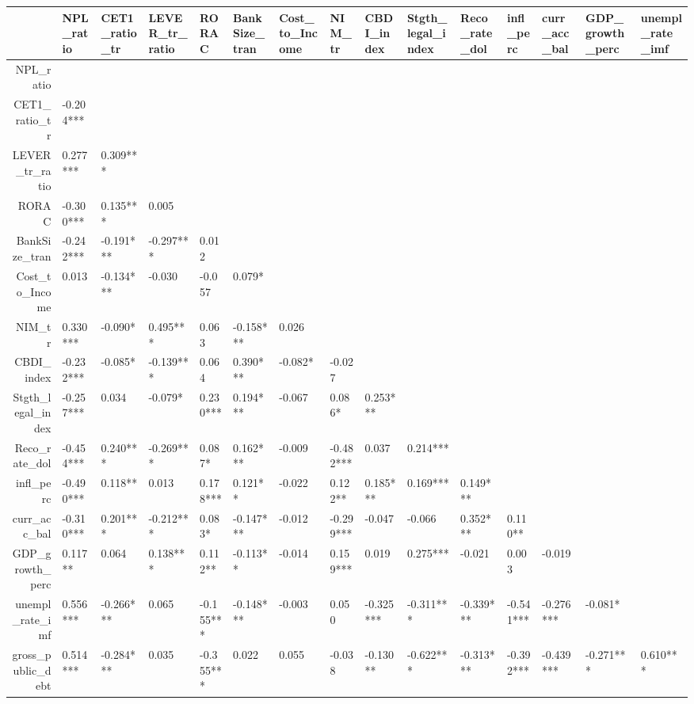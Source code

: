 \begin{table}[ht]
\centering
\begin{tabular}{rllllllllllllll}
  \hline
 & NPL\_ratio & CET1\_ratio\_tr & LEVER\_tr\_ratio & RORAC & BankSize\_tran & Cost\_to\_Income & NIM\_tr & CBDI\_index & Stgth\_legal\_index & Reco\_rate\_dol & infl\_perc & curr\_acc\_bal & GDP\_growth\_perc & unempl\_rate\_imf \\ 
  \hline
NPL\_ratio &  &  &  &  &  &  &  &  &  &  &  &  &  &  \\ 
  CET1\_ratio\_tr & -0.204*** &  &  &  &  &  &  &  &  &  &  &  &  &  \\ 
  LEVER\_tr\_ratio &  0.277*** &  0.309*** &  &  &  &  &  &  &  &  &  &  &  &  \\ 
  RORAC & -0.300*** &  0.135***  &  0.005     &  &  &  &  &  &  &  &  &  &  &  \\ 
  BankSize\_tran & -0.242*** & -0.191*** & -0.297*** &  0.012     &  &  &  &  &  &  &  &  &  &  \\ 
  Cost\_to\_Income &  0.013     & -0.134***  & -0.030     & -0.057     &  0.079*    &  &  &  &  &  &  &  &  &  \\ 
  NIM\_tr &  0.330*** & -0.090*    &  0.495*** &  0.063     & -0.158*** &  0.026     &  &  &  &  &  &  &  &  \\ 
  CBDI\_index & -0.232*** & -0.085*    & -0.139***  &  0.064     &  0.390*** & -0.082*    & -0.027     &  &  &  &  &  &  &  \\ 
  Stgth\_legal\_index & -0.257*** &  0.034     & -0.079*    &  0.230*** &  0.194*** & -0.067     &  0.086*    &  0.253*** &  &  &  &  &  &  \\ 
  Reco\_rate\_dol & -0.454*** &  0.240*** & -0.269*** &  0.087*    &  0.162*** & -0.009     & -0.482*** &  0.037     &  0.214*** &  &  &  &  &  \\ 
  infl\_perc & -0.490*** &  0.118**   &  0.013     &  0.178*** &  0.121**   & -0.022     &  0.122**   &  0.185*** &  0.169*** &  0.149***  &  &  &  &  \\ 
  curr\_acc\_bal & -0.310*** &  0.201*** & -0.212*** &  0.083*    & -0.147***  & -0.012     & -0.299*** & -0.047     & -0.066     &  0.352*** &  0.110**   &  &  &  \\ 
  GDP\_growth\_perc &  0.117**   &  0.064     &  0.138***  &  0.112**   & -0.113**   & -0.014     &  0.159*** &  0.019     &  0.275*** & -0.021     &  0.003     & -0.019     &  &  \\ 
  unempl\_rate\_imf &  0.556*** & -0.266*** &  0.065     & -0.155*** & -0.148***  & -0.003     &  0.050     & -0.325*** & -0.311*** & -0.339*** & -0.541*** & -0.276*** & -0.081*    &  \\ 
  gross\_public\_debt &  0.514*** & -0.284*** &  0.035     & -0.355*** &  0.022     &  0.055     & -0.038     & -0.130**   & -0.622*** & -0.313*** & -0.392*** & -0.439*** & -0.271*** &  0.610*** \\ 
   \hline
\end{tabular}
\end{table}
